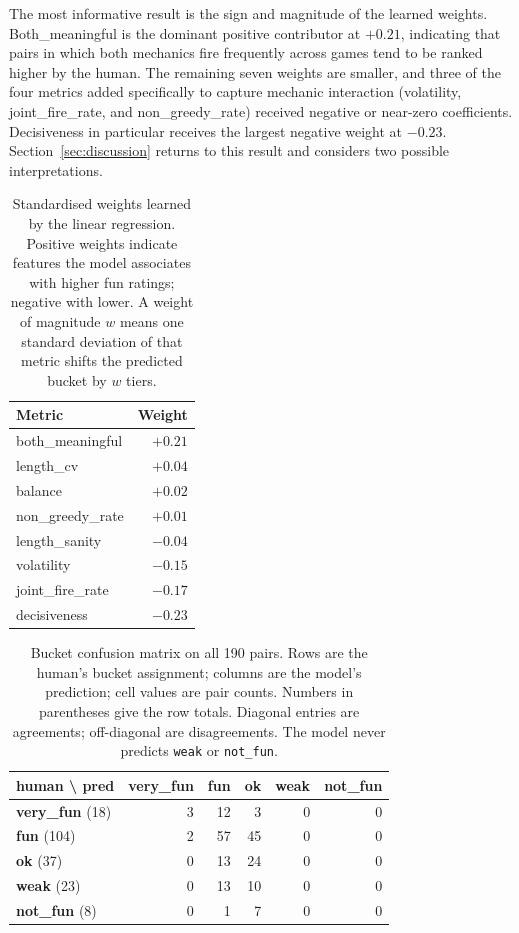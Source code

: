 \documentclass[conference]{IEEEtran}
\begin{document}
The most informative result is the sign and magnitude of the learned weights. Both\_meaningful is the dominant positive contributor at $+0.21$, indicating that pairs in which both mechanics fire frequently across games tend to be ranked higher by the human. The remaining seven weights are smaller, and three of the four metrics added specifically to capture mechanic interaction (volatility, joint\_fire\_rate, and non\_greedy\_rate) received negative or near-zero coefficients. Decisiveness in particular receives the largest negative weight at $-0.23$. Section~\ref{sec:discussion} returns to this result and considers two possible interpretations.

\begin{table}[ht!]
\centering
\caption{Standardised weights learned by the linear regression. Positive weights indicate features the model associates with higher fun ratings; negative with lower. A weight of magnitude $w$ means one standard deviation of that metric shifts the predicted bucket by $w$ tiers.}
\label{tab:fitness_weights}
\begin{tabular}{|l|r|}
\hline
\textbf{Metric} & \textbf{Weight} \\
\hline
both\_meaningful  & $+0.21$ \\
\hline
length\_cv        & $+0.04$ \\
\hline
balance           & $+0.02$ \\
\hline
non\_greedy\_rate & $+0.01$ \\
\hline
length\_sanity    & $-0.04$ \\
\hline
volatility        & $-0.15$ \\
\hline
joint\_fire\_rate & $-0.17$ \\
\hline
decisiveness     & $-0.23$ \\
\hline
\end{tabular}
\end{table}

\begin{table}[ht!]
\centering
\caption{Bucket confusion matrix on all 190 pairs. Rows are the human's bucket assignment; columns are the model's prediction; cell values are pair counts. Numbers in parentheses give the row totals. Diagonal entries are agreements; off-diagonal are disagreements. The model never predicts \texttt{weak} or \texttt{not\_fun}.}
\label{tab:confusion}
\begin{tabular}{|l|r|r|r|r|r|}
\hline
\textbf{human \textbackslash{} pred} & \textbf{very\_fun} & \textbf{fun} & \textbf{ok} & \textbf{weak} & \textbf{not\_fun} \\
\hline
\textbf{very\_fun} (18) &  3 & 12 &  3 & 0 & 0 \\
\hline
\textbf{fun} (104)      &  2 & 57 & 45 & 0 & 0 \\
\hline
\textbf{ok} (37)        &  0 & 13 & 24 & 0 & 0 \\
\hline
\textbf{weak} (23)      &  0 & 13 & 10 & 0 & 0 \\
\hline
\textbf{not\_fun} (8)   &  0 &  1 &  7 & 0 & 0 \\
\hline
\end{tabular}
\end{table}
\end{document}
